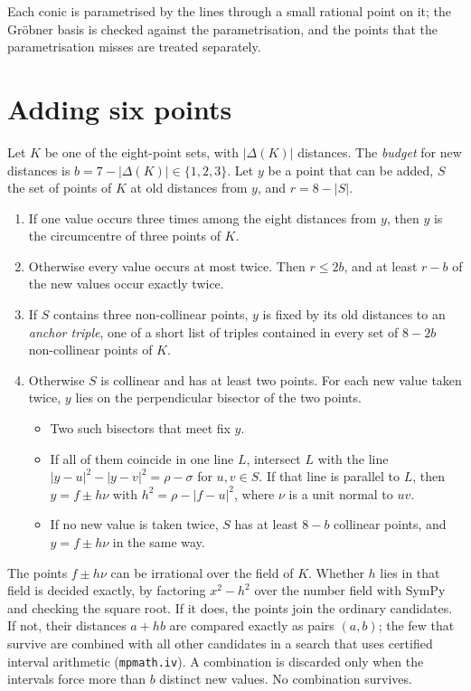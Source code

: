 \documentclass[11pt]{amsart}
\theoremstyle{remark}
\begin{document}
Each conic is parametrised by the lines through a small rational point on it; the Gröbner basis is checked
against the parametrisation, and the points that the parametrisation misses are treated separately.

\section{Adding six points}

Let $K$ be one of the eight-point sets, with $|\Delta(K)|$ distances. The \emph{budget} for new distances is
$b=7-|\Delta(K)|\in\{1,2,3\}$. Let $y$ be a point that can be added, $S$ the set of points of $K$ at old
distances from $y$, and $r=8-|S|$.

\begin{enumerate}
\item If one value occurs three times among the eight distances from $y$, then $y$ is the circumcentre of
  three points of $K$.
\item Otherwise every value occurs at most twice. Then $r\le2b$, and at least $r-b$ of the new values occur
  exactly twice.
\item If $S$ contains three non-collinear points, $y$ is fixed by its old distances to an \emph{anchor
  triple}, one of a short list of triples contained in every set of $8-2b$ non-collinear points of $K$.
\item Otherwise $S$ is collinear and has at least two points. For each new value taken twice, $y$ lies on
  the perpendicular bisector of the two points.
  \begin{itemize}
  \item Two such bisectors that meet fix $y$.
  \item If all of them coincide in one line $L$, intersect $L$ with the line
    $|y-u|^2-|y-v|^2=\rho-\sigma$ for $u,v\in S$. If that line is parallel to $L$, then $y=f\pm h\nu$ with
    $h^2=\rho-|f-u|^2$, where $\nu$ is a unit normal to $uv$.
  \item If no new value is taken twice, $S$ has at least $8-b$ collinear points, and $y=f\pm h\nu$ in the
    same way.
  \end{itemize}
\end{enumerate}

The points $f\pm h\nu$ can be irrational over the field of $K$. Whether $h$ lies in that field is decided
exactly, by factoring $x^2-h^2$ over the number field with SymPy and checking the square root. If it does,
the points join the ordinary candidates. If not, their distances $a+hb$ are compared exactly as pairs
$(a,b)$; the few that survive are combined with all other candidates in a search that uses certified
interval arithmetic (\texttt{mpmath.iv}). A combination is discarded only when the intervals force more
than $b$ distinct new values. No combination survives.
\end{document}

